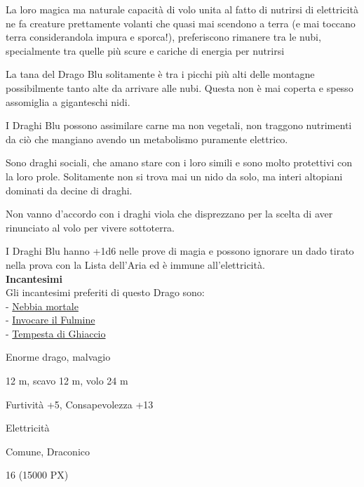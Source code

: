 \begin{multicols}{2}
{La loro magica ma naturale capacità di volo unita al fatto di nutrirsi di elettricità ne fa creature prettamente volanti che quasi mai scendono a terra (e mai toccano terra considerandola impura e sporca!), preferiscono rimanere tra le nubi, specialmente tra quelle più scure e cariche di energia per nutrirsi

La tana del Drago Blu solitamente è tra i picchi più alti delle montagne possibilmente tanto alte da arrivare alle nubi. Questa non è mai coperta e spesso assomiglia a giganteschi nidi.

I Draghi Blu possono assimilare carne ma non vegetali, non traggono nutrimenti da ciò che mangiano avendo un metabolismo puramente elettrico.

Sono draghi sociali, che amano stare con i loro simili e sono molto protettivi con la loro prole.
Solitamente non si trova mai un nido da solo, ma interi altopiani dominati da decine di draghi.

Non vanno d'accordo con i draghi viola che disprezzano per la scelta di aver rinunciato al volo per vivere sottoterra.

I Draghi Blu hanno +1d6 nelle prove di magia e possono ignorare un dado tirato nella prova con la Lista dell'Aria ed è immune all'elettricità.\\
\textbf{Incantesimi}\\
Gli incantesimi preferiti di questo Drago sono:\\
- \hyperlink{Nebbia mortale}{Nebbia mortale}\\
- \hyperlink{Invocare il Fulmine}{Invocare il Fulmine}\\
- \hyperlink{Tempesta di Ghiaccio}{Tempesta di Ghiaccio}

\begin{description}[noitemsep, topsep=0pt, parsep=0pt, partopsep=0pt, itemsep=1pt, leftmargin=2.35cm,  labelwidth=2.2cm, itemindent=0cm, listparindent=0pt] %
\setlength{\baselineskip}{10pt}
\item[\textbf{Taglia/Tipo}] Enorme drago, malvagio
\item[\textbf{Caratt.}] 
\item[\textbf{Punti Ferita}] 
\item[\textbf{Movimento}] 12 m, scavo 12 m, volo 24 m
\item[\textbf{Tiri Salvez.}] 
\item[\textbf{Comp.}] Furtività +5, Consapevolezza +13
\item[\textbf{Imm. Danni}] Elettricità
\item[\textbf{Sensi}] 
\item[\textbf{Linguaggi}] Comune, Draconico
\item[\textbf{Sfida}] 16 (15000 PX)
\end{description}
\smallskip

}
\end{multicols}

